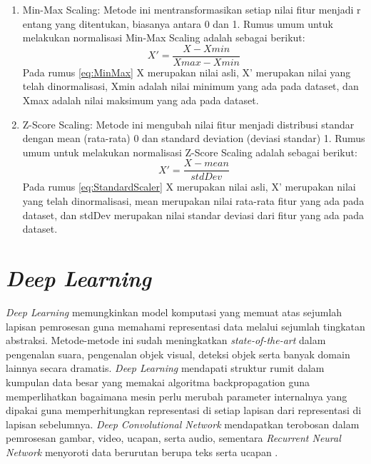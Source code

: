 \begin{enumerate}[nolistsep]
  \item Min-Max Scaling: Metode ini mentransformasikan setiap nilai fitur menjadi r
        entang yang ditentukan, biasanya antara 0 dan 1. Rumus umum untuk melakukan
        normalisasi Min-Max Scaling adalah sebagai berikut:
        \begin{equation}
          \label{eq:MinMax}
          X' = \frac{X - Xmin}{Xmax - Xmin}
        \end{equation}
        Pada rumus \ref{eq:MinMax} X merupakan nilai asli, X' merupakan nilai yang telah
        dinormalisasi, Xmin adalah nilai minimum yang ada pada dataset, dan Xmax adalah nilai
        maksimum yang ada pada dataset.

  \item Z-Score Scaling: Metode ini mengubah nilai fitur menjadi distribusi standar
        dengan mean (rata-rata) 0 dan standard deviation (deviasi standar) 1. Rumus umum
        untuk melakukan normalisasi Z-Score Scaling adalah sebagai berikut:
        \begin{equation}
          \label{eq:StandardScaler}
          X' = \frac{X - mean}{stdDev}
        \end{equation}
        Pada rumus \ref{eq:StandardScaler} X merupakan nilai asli, X' merupakan nilai yang telah
        dinormalisasi, mean merupakan nilai rata-rata fitur yang ada pada dataset, dan stdDev
        merupakan nilai standar deviasi dari fitur yang ada pada dataset.
\end{enumerate}

\newpage
\section{\emph{Deep Learning}}
\emph{Deep Learning} memungkinkan model komputasi yang memuat atas sejumlah lapisan pemrosesan guna memahami representasi data
melalui sejumlah tingkatan abstraksi. Metode-metode ini sudah meningkatkan \emph{state-of-the-art} dalam pengenalan suara,
pengenalan objek visual, deteksi objek serta banyak domain lainnya secara dramatis. \emph{Deep Learning} mendapati struktur
rumit dalam kumpulan data besar yang memakai algoritma backpropagation guna memperlihatkan bagaimana mesin perlu merubah
parameter internalnya yang dipakai guna memperhitungkan representasi di setiap lapisan dari representasi di lapisan
sebelumnya. \emph{Deep Convolutional Network} mendapatkan terobosan dalam pemrosesan gambar, video, ucapan, serta audio,
sementara \emph{Recurrent Neural Network} menyoroti data berurutan berupa teks serta ucapan \parencite{18}.

